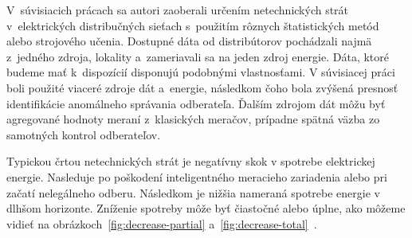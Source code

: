 \documentclass[a4paper,twoside,slovak,12pt]{article}
\begin{document}
V~súvisiacich prácach sa autori zaoberali určením netechnických strát
v~elektrických distribučných sieťach s~použitím rôznych štatistických metód
alebo strojového učenia. Dostupné dáta od distribútorov pochádzali najmä
z~jedného zdroja, lokality a~zameriavali sa na jeden zdroj energie. Dáta, ktoré
budeme mať k~dispozícií disponujú podobnými vlastnosťami. V súvisiacej
práci~\cite{Coma-Puig2016} boli použité viaceré zdroje dát a~energie, následkom
čoho bola zvýšená presnosť identifikácie anomálneho správania odberateľa.
Ďalším zdrojom dát môžu byť agregované hodnoty meraní z~klasických meračov,
prípadne spätná väzba zo samotných kontrol odberateľov.

Typickou črtou netechnických strát je negatívny skok v spotrebe elektrickej
energie. Nasleduje po poškodení inteligentného meracieho zariadenia alebo pri
začatí nelegálneho odberu. Následkom je nižšia nameraná spotrebe energie
v dlhšom horizonte. Zníženie spotreby môže byť čiastočné alebo úplne, ako môžeme
vidieť na obrázkoch~\ref{fig:decrease-partial}
a~\ref{fig:decrease-total}~\cite{Trevizan2015}.
\end{document}
